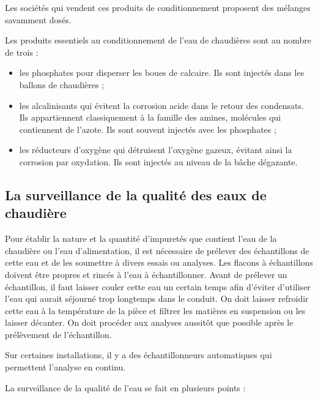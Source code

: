 Les sociétés qui vendent ces produits de conditionnement proposent des mélanges savamment dosés.


Les produits essentiels au conditionnement de l’eau de chaudières sont au nombre de trois :

\begin{itemize}
\item  les phosphates pour disperser les boues de calcaire. Ils sont injectés dans les ballons de chaudières ;
\item  les alcalinisants qui évitent la corrosion acide dans le retour des condensats. Ils appartiennent classiquement à la famille des amines, molécules qui contiennent de l’azote. Ils sont souvent injectés avec les phosphates ;
\item  les réducteurs d’oxygène qui détruisent l’oxygène gazeux, évitant ainsi la corrosion par oxydation. Ils sont injectés au niveau de la bâche dégazante.
\end{itemize}



\subsection{La surveillance de la qualité des eaux de chaudière}

Pour établir la nature et la quantité d’impuretés que contient l’eau de la chaudière ou l’eau d’alimentation, il est nécessaire de prélever des échantillons de cette eau et de les soumettre à divers essais ou analyses.
Les flacons à échantillons doivent être propres et rincés à l’eau à échantillonner. Avant de prélever un échantillon, il faut laisser couler cette eau un certain temps afin d’éviter d’utiliser l’eau qui aurait séjourné trop longtemps dans le conduit. On doit laisser refroidir cette eau à la température de la pièce et filtrer les matières en suspension ou les laisser décanter.
On doit procéder aux analyses aussitôt que possible après le prélèvement de l’échantillon.

Sur certaines installations, il y a des échantillonneurs automatiques qui permettent l’analyse en continu.


La surveillance de la qualité de l’eau se fait en plusieurs points :

